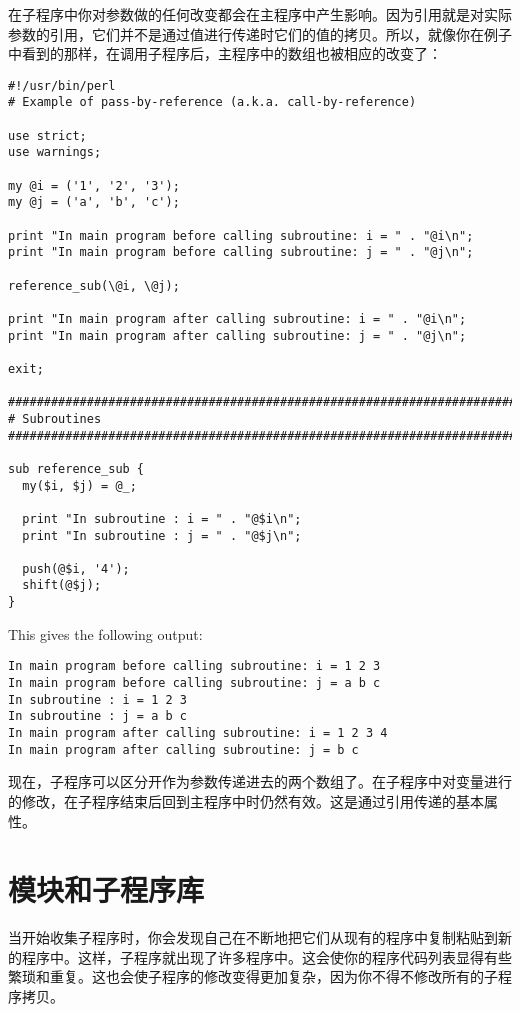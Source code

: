 在子程序中你对参数做的任何改变都会在主程序中产生影响。因为引用就是对实际参数的引用，它们并不是通过值进行传递时它们的值的拷贝。所以，就像你在例子中看到的那样，在调用子程序后，主程序中的数组也被相应的改变了：

\begin{lstlisting}
#!/usr/bin/perl
# Example of pass-by-reference (a.k.a. call-by-reference)

use strict;
use warnings;

my @i = ('1', '2', '3');
my @j = ('a', 'b', 'c');

print "In main program before calling subroutine: i = " . "@i\n";
print "In main program before calling subroutine: j = " . "@j\n";

reference_sub(\@i, \@j);

print "In main program after calling subroutine: i = " . "@i\n";
print "In main program after calling subroutine: j = " . "@j\n";

exit;

################################################################################
# Subroutines
################################################################################

sub reference_sub {
  my($i, $j) = @_;

  print "In subroutine : i = " . "@$i\n";
  print "In subroutine : j = " . "@$j\n";

  push(@$i, '4');
  shift(@$j);
}
\end{lstlisting}

This gives the following output:

\begin{lstlisting}
In main program before calling subroutine: i = 1 2 3
In main program before calling subroutine: j = a b c
In subroutine : i = 1 2 3
In subroutine : j = a b c
In main program after calling subroutine: i = 1 2 3 4
In main program after calling subroutine: j = b c
\end{lstlisting}

现在，子程序可以区分开作为参数传递进去的两个数组了。在子程序中对变量进行的修改，在子程序结束后回到主程序中时仍然有效。这是通过引用传递的基本属性。

\section{模块和子程序库}
当开始收集子程序时，你会发现自己在不断地把它们从现有的程序中复制粘贴到新的程序中。这样，子程序就出现了许多程序中。这会使你的程序代码列表显得有些繁琐和重复。这也会使子程序的修改变得更加复杂，因为你不得不修改所有的子程序拷贝。

